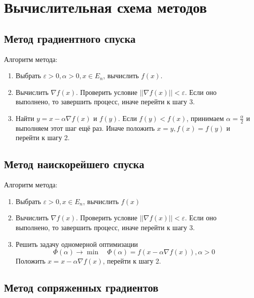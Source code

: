 \section{Вычислительная схема методов}

\subsection{Метод градиентного спуска}

Алгоритм метода:
\begin{enumerate}
	\item Выбрать \(\varepsilon > 0, \alpha > 0, x\in E_n\), вычислить \(f(x)\).
	\item Вычислить \(\nabla f(x)\). Проверить условие \(||\nabla f(x)|| < \varepsilon\). Если оно выполнено, то завершить процесс, иначе перейти к шагу 3.
	\item Найти \(y = x - \alpha \nabla f(x)\) и \(f(y)\). Если \(f(y) < f(x)\), принимаем \(\alpha = \frac{\alpha}{2}\) и выполняем этот шаг ещё раз. Иначе положить \(x = y, f(x) = f(y)\) и перейти к шагу 2.
\end{enumerate}

\subsection{Метод наискорейшего спуска}

Алгоритм метода:
\begin{enumerate}
	\item Выбрать \(\varepsilon > 0, x \in E_n\), вычислить \(f(x)\)
	\item Вычислить \(\nabla f(x)\). Проверить условие \(||\nabla f(x)|| < \varepsilon\). Если оно выполнено, то завершить процесс, иначе перейти к шагу 3.
	\item Решить задачу одномерной оптимизации
	      \[\Phi(\alpha) \to \min \quad \Phi(\alpha) = f(x - \alpha \nabla f(x)), \alpha > 0\]
	      Положить \(x = x - \alpha \nabla f(x)\), перейти к шагу 2.
\end{enumerate}

\subsection{Метод сопряженных градиентов}

